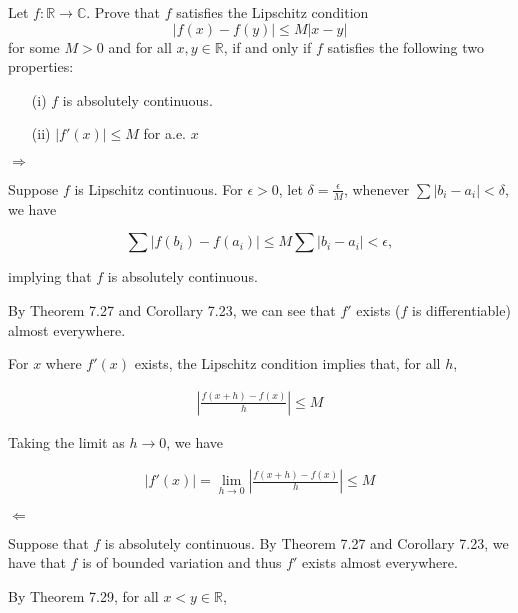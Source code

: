 \documentclass[UTF8,a4paper,10pt]{article}
\begin{document}
\begin{Problem}[]{}
 Let $f : \mathbb{R} \rightarrow \mathbb{C}$. Prove that $f$ satisfies the Lipschitz condition
  \[
  |f(x) - f(y)| \leq M|x - y|
  \]
  for some $M > 0$ and for all $x, y \in \mathbb{R}$, if and only if $f$ satisfies the following two properties:
  \begin{enumerate}
      \item[(i)] $f$ is absolutely continuous.
      \item[(ii)] $|f'(x)| \leq M$ for a.e. $x$
  \end{enumerate}
  
\end{Problem}

\(\Rightarrow \)

Suppose \(f\) is Lipschitz continuous. For \(\epsilon > 0\), let \(\delta = \frac{\epsilon}{M}\), whenever \( \sum |b_i - a_i|< \delta\), we have

\[\sum |f(b_i) - f(a_i)| \leq M \sum |b_i - a_i| < \epsilon,\]

implying that \(f\) is absolutely continuous.

By Theorem 7.27 and Corollary 7.23, we can see that \(f'\) exists (\(f\) is differentiable) almost everywhere.

For \(x\) where \(f'(x)\) exists, the Lipschitz condition implies that, for all \(h\),

\begin{equation*}
  \begin{aligned}
    \left| \frac{f(x+h) - f(x)}{h} \right| \leq M
  \end{aligned}
\end{equation*}

Taking the limit as \(h\to 0\), we have

\begin{equation*}
  \begin{aligned}
    \left|f'(x) \right|  = \lim_{h\to 0}\left| \frac{f(x+h) - f(x)}{h} \right| \leq M
  \end{aligned}
\end{equation*}

\dotfill

\(\Leftarrow \)

Suppose that \(f\) is absolutely continuous. By Theorem 7.27 and Corollary 7.23, we have that \(f\) is of bounded variation and thus \(f'\) exists almost everywhere.

By Theorem 7.29, for all \(x < y \in \mathbb{R} \),
\end{document}

